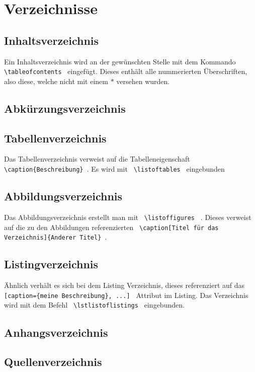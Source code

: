 \section{Verzeichnisse}
\subsection{Inhaltsverzeichnis}
Ein Inhaltsverzeichnis wird an der gewünschten Stelle mit dem Kommando 
\lstinline$ \tableofcontents $ eingefügt. Dieses enthält alle nummerierten 
Überschriften, also diese, welche nicht mit einem $*$ versehen wurden.
\subsection{Abkürzungsverzeichnis}

\subsection{Tabellenverzeichnis}
Das Tabellenverzeichnis verweist auf die Tabelleneigenschaft 
\lstinline$ \caption{Beschreibung} $. Es wird mit 
\lstinline $ \listoftables $ eingebunden

\subsection{Abbildungsverzeichnis}
Das Abbildungsverzeichnis erstellt man mit \lstinline$ \listoffigures $ . 
Dieses verweist auf die zu den Abbildungen referenzierten 
\lstinline $ \caption[Titel für das Verzeichnis]{Anderer Titel} $.
\subsection{Listingverzeichnis}
Ähnlich verhält es sich bei dem Listing Verzeichnis, dieses referenziert auf 
das \lstinline $ [caption={meine Beschreibung}, ...] $ Attribut im Listing.
Das Verzeichnis wird mit dem Befehl \lstinline $ \lstlistoflistings $ 
eingebunden.
\subsection{Anhangsverzeichnis}
\subsection{Quellenverzeichnis}